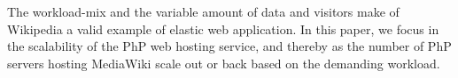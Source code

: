 






The workload-mix and the variable amount of data and visitors make of Wikipedia a valid example of elastic web application. In this paper, we focus in the scalability of the PhP web hosting service, and thereby as the number of PhP servers hosting MediaWiki scale out or back based on the demanding workload.

